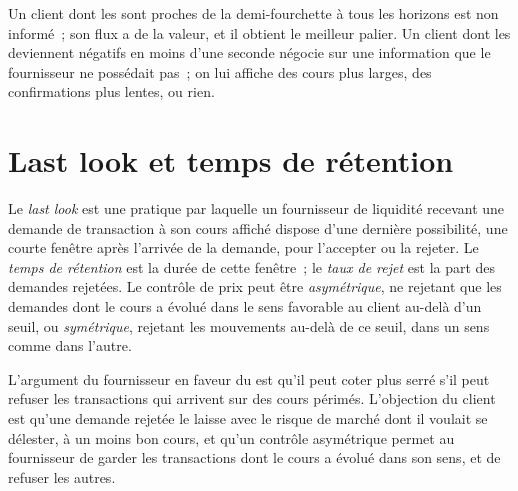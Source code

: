 Un client dont les  sont proches de la demi-fourchette à tous les horizons est
non informé~; son flux a de la valeur, et il obtient le meilleur palier. Un client dont les
 deviennent négatifs en moins d'une seconde négocie sur une information que le
fournisseur ne possédait pas~; on lui affiche des cours plus larges, des confirmations plus lentes, ou rien.

\section{Last look et temps de rétention}

\begin{definition}\label{def:m2:fx-spot-microstructure:lastlook}
Le \emph{last look} est une pratique par laquelle un fournisseur de liquidité
recevant une demande de transaction à son cours affiché dispose d'une dernière possibilité, une courte
fenêtre après l'arrivée de la demande, pour l'accepter ou la rejeter. Le \emph{temps de
rétention} est la durée de cette fenêtre~; le \emph{taux de
rejet} est la part des demandes rejetées. Le contrôle de prix peut
être \emph{asymétrique}, ne rejetant que les demandes dont le cours a évolué dans le
sens favorable au client au-delà d'un seuil, ou \emph{symétrique}, rejetant les mouvements au-delà
de ce seuil, dans un sens comme dans l'autre.
\end{definition}

L'argument du fournisseur en faveur du  est qu'il peut coter plus serré s'il peut
refuser les transactions qui arrivent sur des cours périmés. L'objection du client est qu'une
demande rejetée le laisse avec le risque de marché dont il voulait se délester, à un moins bon
cours, et qu'un contrôle asymétrique permet au fournisseur de garder les transactions dont
le cours a évolué dans son sens, et de refuser les autres.

